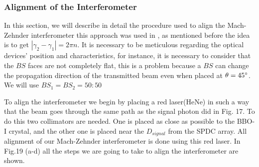 \documentclass[12pt]{article}
\begin{document}
\subsubsection{Alignment of the Interferometer}

In this section, we will describe in detail the procedure used to align the Mach-Zehnder interferometer this approach was used in \cite{zuri}, as mentioned before the idea is to get $|\gamma_{2}-\gamma_{1}|=2\pi n$. It is necessary to be meticulous regarding the optical devices' position and characteristics, for instance, it is necessary to consider that the $BS$ faces are not completely flat, this is a problem because a $BS$ can change the propagation direction of the transmitted beam even when placed at $\theta=45\degree$. We will use $BS_{1}=BS_{2}=50:50$

To align the interferometer we begin by placing a red laser(HeNe) in such a way that the beam goes through the same path as the signal photon did in Fig. 17. To do this two collimators are needed. One is placed as close as possible to the BBO-I crystal, and the other one is placed near the $D_{signal}$ from the SPDC array. All alignment of our Mach-Zehnder interferometer is done using this red laser. In Fig.19 (a-d) all the steps we are going to take to align the interferometer are shown.
\end{document}
